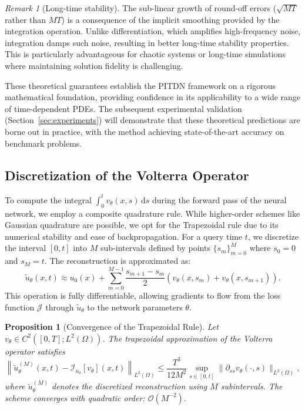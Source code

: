 \documentclass[11pt,reqno]{amsart}
\theoremstyle{plain}
\newtheorem{proposition}[theorem]{Proposition}
\theoremstyle{definition}
\theoremstyle{remark}
\newtheorem{remark}[theorem]{Remark}
\begin{document}
\begin{remark}[Long-time stability]
The sub-linear growth of round-off errors ($\sqrt{MT}$ rather than $MT$) is a consequence of the implicit smoothing provided by the integration operation. Unlike differentiation, which amplifies high-frequency noise, integration damps such noise, resulting in better long-time stability properties. This is particularly advantageous for chaotic systems or long-time simulations where maintaining solution fidelity is challenging.
\end{remark}

These theoretical guarantees establish the PITDN framework on a rigorous mathematical foundation, providing confidence in its applicability to a wide range of time-dependent PDEs. The subsequent experimental validation (Section~\ref{sec:experiments}) will demonstrate that these theoretical predictions are borne out in practice, with the method achieving state-of-the-art accuracy on benchmark problems.



\subsection{Discretization of the Volterra Operator}

To compute the integral $\displaystyle \int_0^t v_\theta(x,s) \, \mathrm{d}s$ during the forward pass of the neural network, we employ a composite quadrature rule. While higher-order schemes like Gaussian quadrature are possible, we opt for the Trapezoidal rule due to its numerical stability and ease of backpropagation. For a query time $t$, we discretize the interval $[0, t]$ into $M$ sub-intervals defined by points $\{s_m\}_{m=0}^M$ where $s_0=0$ and $s_M=t$. The reconstruction is approximated as:
\begin{equation}\label{eq:trapezoidal_approximation}
    \tilde{u}_\theta(x,t) \approx u_0(x) + \sum_{m=0}^{M-1} \frac{s_{m+1}-s_m}{2} \left( v_\theta(x, s_m) + v_\theta(x, s_{m+1}) \right).
\end{equation}
This operation is fully differentiable, allowing gradients to flow from the loss function $\mathcal{J}$ through $\tilde{u}_\theta$ to the network parameters $\theta$.

\begin{proposition}[Convergence of the Trapezoidal Rule]\label{prop:quadrature_convergence}
Let $v_\theta \in C^2([0,T]; L^2(\Omega))$. The trapezoidal approximation of the Volterra operator satisfies
\begin{equation}\label{eq:quadrature_error_bound}
\left\|\tilde{u}_\theta^{(M)}(x,t) - \mathcal{I}_{u_0}[v_\theta](x,t)\right\|_{L^2(\Omega)} 
\leq \frac{T^3}{12M^2} \sup_{s \in [0,t]} \|\partial_{ss} v_\theta(\cdot, s)\|_{L^2(\Omega)},
\end{equation}
where $\tilde{u}_\theta^{(M)}$ denotes the discretized reconstruction using $M$ subintervals. The scheme converges with quadratic order: $\mathcal{O}(M^{-2})$.
\end{proposition}
\end{document}
